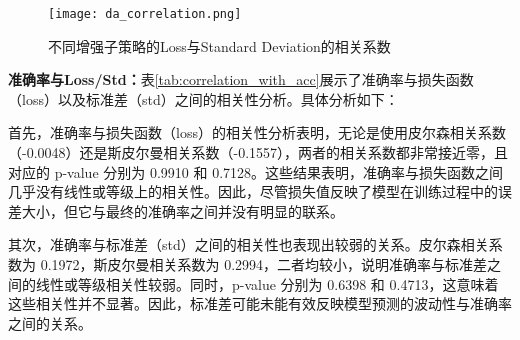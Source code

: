 \documentclass[master]{thesis-uestc}
\begin{document}
\begin{figure}[h]
    \centering
    \texttt{[image: da\_correlation.png]}
    \caption{不同增强子策略的Loss与Standard Deviation的相关系数}
    \label{}
\end{figure}
\textbf{准确率与Loss/Std：}表\ref{tab:correlation_with_acc}展示了准确率与损失函数（loss）以及标准差（std）之间的相关性分析。具体分析如下：

首先，准确率与损失函数（loss）的相关性分析表明，无论是使用皮尔森相关系数（-0.0048）还是斯皮尔曼相关系数（-0.1557），两者的相关系数都非常接近零，且对应的 p-value 分别为 0.9910 和 0.7128。这些结果表明，准确率与损失函数之间几乎没有线性或等级上的相关性。因此，尽管损失值反映了模型在训练过程中的误差大小，但它与最终的准确率之间并没有明显的联系。

其次，准确率与标准差（std）之间的相关性也表现出较弱的关系。皮尔森相关系数为 0.1972，斯皮尔曼相关系数为 0.2994，二者均较小，说明准确率与标准差之间的线性或等级相关性较弱。同时，p-value 分别为 0.6398 和 0.4713，这意味着这些相关性并不显著。因此，标准差可能未能有效反映模型预测的波动性与准确率之间的关系。
\end{document}
